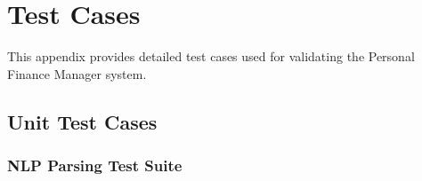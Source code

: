 
\chapter{Test Cases}

This appendix provides detailed test cases used for validating the Personal Finance Manager system.

\section{Unit Test Cases}

\subsection{NLP Parsing Test Suite}

